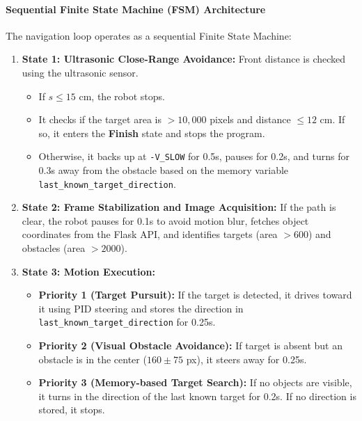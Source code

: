 \paragraph{Sequential Finite State Machine (FSM) Architecture}
The navigation loop operates as a sequential Finite State Machine:
\begin{enumerate}
    \item \textbf{State 1: Ultrasonic Close-Range Avoidance:} Front distance is checked using the ultrasonic sensor.
    \begin{itemize}
        \item If $s \le 15$ cm, the robot stops.
        \item It checks if the target area is $> 10,000$ pixels and distance $\le 12$ cm. If so, it enters the \textbf{Finish} state and stops the program.
        \item Otherwise, it backs up at \texttt{-V\_SLOW} for 0.5s, pauses for 0.2s, and turns for 0.3s away from the obstacle based on the memory variable \texttt{last\_}\allowbreak\texttt{known\_}\allowbreak\texttt{target\_}\allowbreak\texttt{direction}.
    \end{itemize}
    
    \item \textbf{State 2: Frame Stabilization and Image Acquisition:} If the path is clear, the robot pauses for 0.1s to avoid motion blur, fetches object coordinates from the Flask API, and identifies targets (area $> 600$) and obstacles (area $> 2000$).
    
    \item \textbf{State 3: Motion Execution:}
    \begin{itemize}
        \item \textbf{Priority 1 (Target Pursuit):} If the target is detected, it drives toward it using PID steering and stores the direction in \texttt{last\_}\allowbreak\texttt{known\_}\allowbreak\texttt{target\_}\allowbreak\texttt{direction} for 0.25s.
        \item \textbf{Priority 2 (Visual Obstacle Avoidance):} If target is absent but an obstacle is in the center ($160 \pm 75$ px), it steers away for 0.25s.
        \item \textbf{Priority 3 (Memory-based Target Search):} If no objects are visible, it turns in the direction of the last known target for 0.2s. If no direction is stored, it stops.
    \end{itemize}
\end{enumerate}

